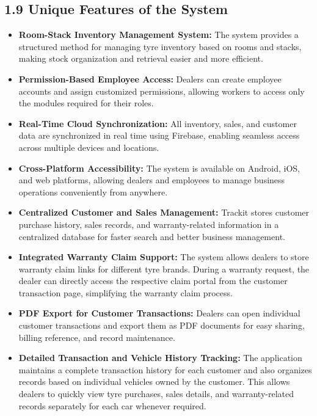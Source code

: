 \documentclass[12pt, oneside]{article}
\begin{document}
\subsection*{1.9 Unique Features of the System}
\begin{itemize}
    \item \textbf{Room-Stack Inventory Management System:} The system provides a structured method for managing tyre inventory based on rooms and stacks, making stock organization and retrieval easier and more efficient.
    \item \textbf{Permission-Based Employee Access:} Dealers can create employee accounts and assign customized permissions, allowing workers to access only the modules required for their roles.
    \item \textbf{Real-Time Cloud Synchronization:} All inventory, sales, and customer data are synchronized in real time using Firebase, enabling seamless access across multiple devices and locations.
    \item \textbf{Cross-Platform Accessibility:} The system is available on Android, iOS, and web platforms, allowing dealers and employees to manage business operations conveniently from anywhere.
    \item \textbf{Centralized Customer and Sales Management:} Trackit stores customer purchase history, sales records, and warranty-related information in a centralized database for faster search and better business management.
    \item \textbf{Integrated Warranty Claim Support:} The system allows dealers to store warranty claim links for different tyre brands. During a warranty request, the dealer can directly access the respective claim portal from the customer transaction page, simplifying the warranty claim process.
    \item \textbf{PDF Export for Customer Transactions:} Dealers can open individual customer transactions and export them as PDF documents for easy sharing, billing reference, and record maintenance.
    \item \textbf{Detailed Transaction and Vehicle History Tracking:} The application maintains a complete transaction history for each customer and also organizes records based on individual vehicles owned by the customer. This allows dealers to quickly view tyre purchases, sales details, and warranty-related records separately for each car whenever required.
\end{itemize}
\end{document}
